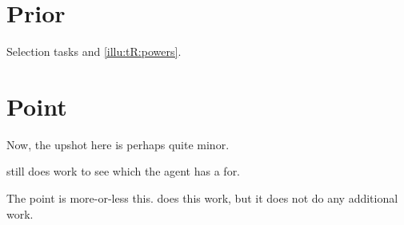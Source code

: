 \section{Prior }
\label{sec:cscen1}

\begin{note}
  Selection tasks and \autoref{illu:tR:powers}.
\end{note}

\section{Point}
\label{sec:point}

\begin{note}
  Now, the upshot here is perhaps quite minor.

  \issueInclusion{} still does work to see which \ros{} the agent has a \wit{} for.

  The point is more-or-less this.
  \issueInclusion{} does this work, but it does not do any additional work.
\end{note}



